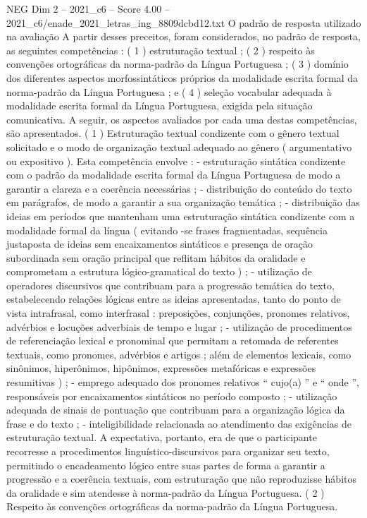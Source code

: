 \begin{textsample}{NEG Dim 2 – 2021\_c6 – Score 4.00 – 2021\_c6/enade\_2021\_letras\_ing\_8809dcbd12.txt}
O padrão de resposta utilizado na avaliação A partir desses preceitos, foram considerados, no padrão de resposta, as seguintes competências : ( 1 ) estruturação textual ; ( 2 ) respeito às convenções ortográficas da norma-padrão da Língua Portuguesa ; ( 3 ) domínio dos diferentes aspectos morfossintáticos próprios da modalidade escrita formal da norma-padrão da Língua Portuguesa ; e ( 4 ) seleção vocabular adequada à modalidade escrita formal da Língua Portuguesa, exigida pela situação comunicativa.
A seguir, os aspectos avaliados por cada uma destas competências, são apresentados. ( 1 ) Estruturação textual condizente com o gênero textual solicitado e o modo de organização textual adequado ao gênero ( argumentativo ou expositivo ).
Esta competência envolve : - estruturação sintática condizente com o padrão da modalidade escrita formal da Língua Portuguesa de modo a garantir a clareza e a coerência necessárias ; - distribuição do conteúdo do texto em parágrafos, de modo a garantir a sua organização temática ; - distribuição das ideias em períodos que mantenham uma estruturação sintática condizente com a modalidade formal da língua ( evitando -se frases fragmentadas, sequência justaposta de ideias sem encaixamentos sintáticos e presença de oração subordinada sem oração principal que reflitam hábitos da oralidade e comprometam a estrutura lógico-gramatical do texto ) ; - utilização de operadores discursivos que contribuam para a progressão temática do texto, estabelecendo relações lógicas entre as ideias apresentadas, tanto do ponto de vista intrafrasal, como interfrasal : preposições, conjunções, pronomes relativos, advérbios e locuções adverbiais de tempo e lugar ; - utilização de procedimentos de referenciação lexical e pronominal que permitam a retomada de referentes textuais, como pronomes, advérbios e artigos ; além de elementos lexicais, como sinônimos, hiperônimos, hipônimos, expressões metafóricas e expressões resumitivas ) ; - emprego adequado dos pronomes relativos “ cujo(a) ” e “ onde ”, responsáveis por encaixamentos sintáticos no período composto ; - utilização adequada de sinais de pontuação que contribuam para a organização lógica da frase e do texto ; - inteligibilidade relacionada ao atendimento das exigências de estruturação textual.
A expectativa, portanto, era de que o participante recorresse a procedimentos linguístico-discursivos para organizar seu texto, permitindo o encadeamento lógico entre suas partes de forma a garantir a progressão e a coerência textuais, com estruturação que não reproduzisse hábitos da oralidade e sim atendesse à norma-padrão da Língua Portuguesa. ( 2 ) Respeito às convenções ortográficas da norma-padrão da Língua Portuguesa.

\end{textsample}
